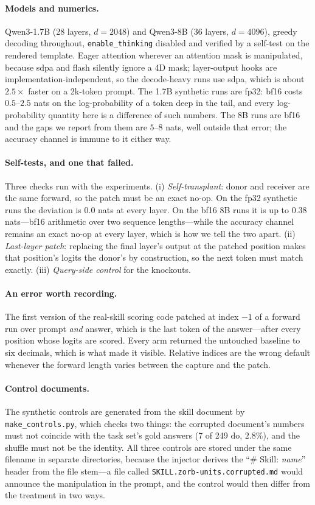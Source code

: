 \documentclass{article}
\begin{document}
\paragraph{Models and numerics.} Qwen3-1.7B (28 layers, $d=2048$) and Qwen3-8B
(36 layers, $d=4096$), greedy decoding throughout, \texttt{enable\_thinking}
disabled and verified by a self-test on the rendered template. Eager attention
wherever an attention mask is manipulated, because sdpa and flash silently
ignore a 4D mask; layer-output hooks are implementation-independent, so the
decode-heavy runs use sdpa, which is about $2.5\times$ faster on a 2k-token
prompt. The 1.7B synthetic runs are fp32: bf16 costs $0.5$--$2.5$ nats on the
log-probability of a token deep in the tail, and every log-probability quantity
here is a difference of such numbers. The 8B runs are bf16 and the gaps we
report from them are $5$--$8$ nats, well outside that error; the accuracy
channel is immune to it either way.

\paragraph{Self-tests, and one that failed.} Three checks run with the
experiments. (i) \emph{Self-transplant}: donor and receiver are the same
forward, so the patch must be an exact no-op. On the fp32 synthetic runs the
deviation is $0.0$ nats at every layer. On the bf16 8B runs it is up to $0.38$
nats---bf16 arithmetic over two sequence lengths---while the accuracy channel
remains an exact no-op at every layer, which is how we tell the two apart.
(ii) \emph{Last-layer patch}: replacing the final layer's output at the patched
position makes that position's logits the donor's by construction, so the next
token must match exactly. (iii) \emph{Query-side control} for the knockouts.

\paragraph{An error worth recording.} The first version of the real-skill
scoring code patched at index $-1$ of a forward run over prompt \emph{and}
answer, which is the last token of the answer---after every position whose
logits are scored. Every arm returned the untouched baseline to six decimals,
which is what made it visible. Relative indices are the wrong default whenever
the forward length varies between the capture and the patch.

\paragraph{Control documents.} The synthetic controls are generated from the
skill document by \texttt{make\_controls.py}, which checks two things: the
corrupted document's numbers must not coincide with the task set's gold answers
(7 of 249 do, $2.8\%$), and the shuffle must not be the identity. All three
controls are stored under the same filename in separate directories, because the
injector derives the ``\# Skill: \emph{name}'' header from the file stem---a file
called \texttt{SKILL.zorb-units.corrupted.md} would announce the manipulation in
the prompt, and the control would then differ from the treatment in two ways.
\end{document}
